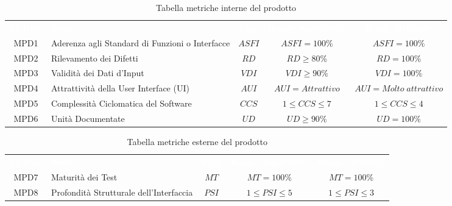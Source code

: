 \renewcommand{\arraystretch}{1.5}
\begin{longtable}{ c C{4cm} c c c}
\caption{Tabella metriche interne del prodotto}\\
\textcolor{white}{\textbf{Metrica}} & \textcolor{white}{\textbf{Nome}} & \textcolor{white}{\textbf{Sigla}} & \textcolor{white}{\textbf{Range Accettabile}} & \textcolor{white}{\textbf{Range Ottimale}}\\
    MPD1 & Aderenza agli Standard di Funzioni o Interfacce & $ASFI$ & $ASFI = 100\%$ & $ASFI = 100\%$\\
    MPD2 & Rilevamento dei Difetti & $RD$ & $ RD \geq 80\% $ & $RD = 100\%$\\
    MPD3 & Validità dei Dati d'Input & $VDI$ &  $VDI \geq 90\%$ &  $VDI = 100\%$\\
    MPD4 & Attrattività della User Interface (UI) & $AUI$ & $AUI = Attrattivo$ &  $AUI = Molto \; attrattivo$\\
    MPD5 & Complessità Ciclomatica del Software & $CCS $ & $1 \leq CCS \leq 7 $ & $1 \leq CCS \leq 4$\\
    MPD6 & Unità Documentate & $UD$ & $UD \geq 90\%$ & $UD = 100\%$\\
\end{longtable} 

\newpage %

\renewcommand{\arraystretch}{1.5}
\begin{longtable}{ c C{4cm} c c c}
\caption{Tabella metriche esterne del prodotto}\\
\textcolor{white}{\textbf{Metrica}} & \textcolor{white}{\textbf{Nome}} & \textcolor{white}{\textbf{Sigla}} & \textcolor{white}{\textbf{Range Accettabile}} & \textcolor{white}{\textbf{Range Ottimale}}\\
    MPD7 & Maturità dei Test & $MT$ & $MT = 100\%$ & $MT = 100\%$\\
    MPD8 & Profondità Strutturale dell'Interfaccia & $PSI$ & $1 \leq PSI \leq 5$ &$1 \leq PSI \leq 3$\\
\end{longtable}
